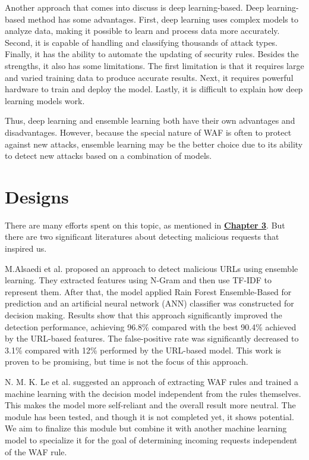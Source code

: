 Another approach that comes into discuss is deep learning-based. Deep learning-based method has some advantages. First, deep learning uses complex models to analyze data, making it possible to learn and process data more accurately. Second, it is capable of handling and classifying thousands of attack types. Finally, it has the ability to automate the updating of security rules. Besides the strengths, it also has some limitations. The first limitation is that it requires large and varied training data to produce accurate results. Next, it requires powerful hardware to train and deploy the model. Lastly, it is difficult to explain how deep learning models work. 

Thus, deep learning and ensemble learning both have their own advantages and disadvantages. However, because the special nature of WAF is often to protect against new attacks, ensemble learning may be the better choice due to its ability to detect new attacks based on a combination of models.

\section{Designs}
\label{design}
\hspace{0.5cm}There are many efforts spent on this topic, as mentioned in \hyperref[chap:literaturereview]{\textbf{Chapter 3}}. But there are two significant literatures about detecting malicious requests that inspired us. 

M.Alsaedi et al.\cite{s22093373} proposed an approach to detect malicious URLs using ensemble learning. They extracted features using N-Gram and then use TF-IDF to represent them. After that, the model applied Rain Forest Ensemble-Based for prediction and an artificial neural network (ANN) classifier was constructed for decision making. Results show that this approach significantly improved the detection performance, achieving 96.8\% compared with the best 90.4\% achieved by the URL-based features. The false-positive rate was significantly decreased to 3.1\% compared with 12\% performed by the URL-based model. This work is proven to be promising, but time is not the focus of this approach. 

N. M. K. Le et al.\cite{Khoi} suggested an approach of extracting WAF rules and trained a machine learning with the decision model independent from the rules themselves. This makes the model more self-reliant and the overall result more neutral. The module has been tested, and though it is not completed yet, it shows potential. We aim to finalize this module but combine it with another machine learning model to specialize it for the goal of determining incoming requests independent of the WAF rule.

